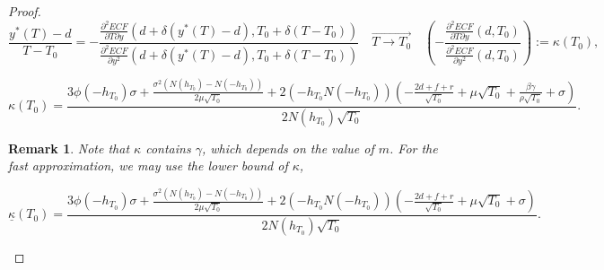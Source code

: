 \documentclass[11pt]{article}
\theoremstyle{plain}
\numberwithin{equation}{section}
\newtheorem{remk}{Remark}
\begin{document}
{\begin{proof}
{$$
\frac{y^*(T)-d}{T-T_0}=- \frac{\frac{\partial^2 ECF}{\partial T \partial y } (d+\delta (y^* (T)-d), T_0 + \delta (T-T_0) )}{\frac{\partial^2 ECF}{\partial y^2 } (d+\delta (y^* (T)-d), T_0 + \delta (T-T_0) )} \quad \overrightarrow{T\to T_0} \quad \left(- \frac{\frac{\partial^2 ECF}{\partial T \partial y } (d, T_0 )}{\frac{\partial^2 ECF}{\partial y^2 } (d, T_0 )} \right):=\kappa(T_0),
$$
%
%



\begin{equation}\label{kappa}
\kappa({T_0})= \frac{{3 \phi(-h_{T_0})}\sigma  + \frac{ \sigma^2(N(h_{T_0}) - N(-h_{T_0})) }{2\mu\sqrt{T_0}}+{2 (-h_{T_0} N(-h_{T_0}))} \left(
	-\frac{2d+f+r}{\sqrt{T_0}}+\mu \sqrt{T_0}+\frac{\beta\gamma}{\rho\sqrt{T_0}}	
	+ \sigma \right)}{{2 N(h_{T_0})\sqrt{T_0} }
}.
\end{equation}


}
\begin{remk}
	
	Note that  $\kappa$ contains $\gamma$, which depends on the value of $m$. For the fast approximation, we may use the lower bound of $\kappa$, 
	
	\begin{equation}\label{kappa.lb}\nonumber
	\underline{\kappa}({T_0})= \frac{{3 \phi(-h_{T_0})}\sigma  + \frac{ \sigma^2(N(h_{T_0}) - N(-h_{T_0})) }{2\mu\sqrt{T_0}}+{2 (-h_{T_0} N(-h_{T_0}))} \left(
		-\frac{2d+f+r}{\sqrt{T_0}}+\mu \sqrt{T_0}	
		+ \sigma \right)}{{2 N(h_{T_0})\sqrt{T_0} }
	}.
	\end{equation}
	
\end{remk}


\end{proof}}
\end{document}
